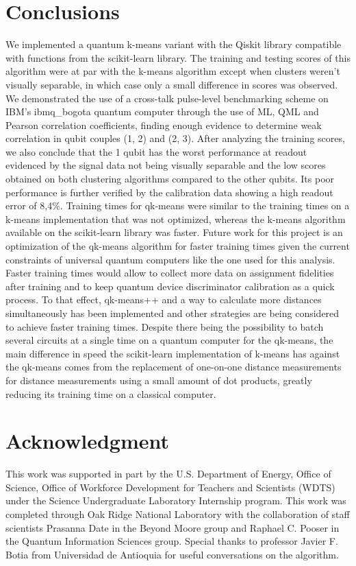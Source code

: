 \documentclass[conference]{IEEEtran}
\begin{document}
\section{Conclusions}
We implemented a quantum k-means variant with the Qiskit library compatible with functions from the scikit-learn library. The training and testing scores of this algorithm were at par with the k-means algorithm except when clusters weren't visually separable, in which case only a small difference in scores was observed. We demonstrated the use of a cross-talk pulse-level benchmarking scheme on IBM's ibmq\_bogota quantum computer through the use of ML, QML and Pearson correlation coefficients, finding enough evidence to determine weak correlation in qubit couples (1, 2) and (2, 3). After analyzing the training scores, we also conclude that the 1 qubit has the worst performance at readout evidenced by the signal data not being visually separable and the low scores obtained on both clustering algorithms compared to the other qubits. Its poor performance is further verified by the calibration data showing a high readout error of 8,4\%. Training times for qk-means were similar to the training times on a k-means implementation that was not optimized, whereas the k-means algorithm available on the scikit-learn library was faster. Future work for this project is an optimization of the qk-means algorithm for faster training times given the current constraints of universal quantum computers like the one used for this analysis. Faster training times would allow to collect more data on assignment fidelities after training and to keep quantum device discriminator calibration as a quick process. To that effect, qk-means++ and a way to calculate more distances simultaneously has been implemented and other strategies are being considered to achieve faster training times. Despite there being the possibility to batch several circuits at a single time on a quantum computer for the qk-means, the main difference in speed the scikit-learn implementation of k-means has against the qk-means comes from the replacement of one-on-one distance measurements for distance measurements using a small amount of dot products, greatly reducing its training time on a classical computer.

\section*{Acknowledgment}

This work was supported in part by the U.S. Department of Energy, Office of Science, Office of Workforce Development for Teachers and Scientists (WDTS) under the Science Undergraduate Laboratory Internship program. This work was completed through Oak Ridge National Laboratory with the collaboration of staff scientists Prasanna Date in the Beyond Moore group and Raphael C. Pooser in the Quantum Information Sciences group. Special thanks to professor Javier F. Botia from Universidad de Antioquia for useful conversations on the algorithm.



\end{document}
